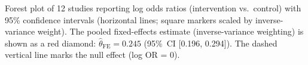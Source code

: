 \caption{Forest plot of 12 studies reporting log odds ratios (intervention vs.\ control)
with 95\% confidence intervals (horizontal lines; square markers scaled by inverse-variance weight).
The pooled fixed-effects estimate (inverse-variance weighting) is shown as a red diamond:
$\hat{\theta}_{\mathrm{FE}} = 0.245$ (95\%~CI [0.196, 0.294]).
The dashed vertical line marks the null effect (log OR = 0).}
